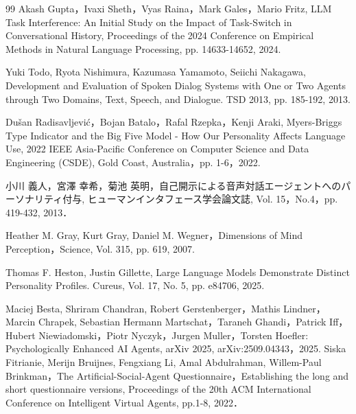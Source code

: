 \documentclass[10pt,twocolumn]{jsarticle}
\begin{document}
\begin{thebibliography}{99}
Akash Gupta，Ivaxi Sheth，Vyas Raina，Mark Gales，Mario Fritz, LLM Task Interference: An Initial Study on the Impact of Task-Switch in Conversational History, Proceedings of the 2024 Conference on Empirical Methods in Natural Language Processing, pp. 14633-14652, 2024. 

Yuki Todo, Ryota Nishimura, Kazumasa Yamamoto, Seiichi Nakagawa, Development and Evaluation of Spoken Dialog Systems with One or Two Agents through Two Domains, Text, Speech, and Dialogue. TSD 2013, pp. 185-192, 2013. 

 Dušan Radisavljević，Bojan Batalo，Rafal Rzepka，Kenji Araki, Myers-Briggs Type Indicator and the Big Five Model - How Our Personality Affects Language Use, 2022 IEEE Asia-Pacific Conference on Computer Science and Data Engineering (CSDE), Gold Coast, Australia，pp. 1-6，2022. 

小川 義人，宮澤 幸希，菊池 英明，自己開示による音声対話エージェントへのパーソナリティ付与, ヒューマンインタフェース学会論文誌, Vol. 15，No.4，pp. 419-432, 2013．

Heather M. Gray, Kurt Gray, Daniel M. Wegner，Dimensions of Mind Perception，Science, Vol. 315, pp. 619, 2007. 

Thomas F. Heston, Justin Gillette, Large Language Models Demonstrate Distinct Personality Profiles. Cureus, Vol. 17, No. 5, pp. e84706, 2025. 


Maciej Besta, Shriram Chandran, Robert Gerstenberger，Mathis Lindner，Marcin Chrapek, Sebastian Hermann Martschat，Taraneh Ghandi，Patrick Iff，Hubert Niewiadomski，Piotr Nyczyk，Jurgen Muller，Torsten Hoefler: Psychologically Enhanced AI Agents, arXiv 2025, arXiv:2509.04343，2025. 
Siska Fitrianie, Merĳn Bruĳnes, Fengxiang Li, Amal Abdulrahman, Willem-Paul Brinkman，The Artificial-Social-Agent Questionnaire，Establishing the long and short questionnaire versions, Proceedings of the 20th ACM International Conference on Intelligent Virtual Agents, pp.1-8, 2022．


\end{thebibliography}
\end{document}
